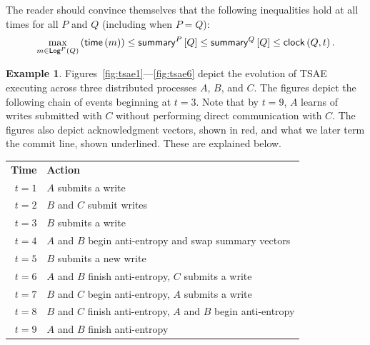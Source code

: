 \documentclass[]             %
{NASA}                       %
\theoremstyle{definition}
\newtheorem{example}[theorem]{Example}
\begin{document}
The reader should convince themselves that the following inequalities
hold at all times for all $P$ and $Q$ (including when $P = Q$):
\[
  \max_{m \in \mathsf{Log}^{P}\left(Q\right)}\left({\mathsf{time}\left(m\right)}\right) \leq \mathsf{summary}^{P}\left[Q\right] \leq \mathsf{summary}^{Q}\left[Q\right] \leq \mathsf{clock}\left(Q,t\right).
\]

\begin{example}
  \label{ex:tsae}
  Figures~\ref{fig:tsae1}---\ref{fig:tsae6} depict the evolution of
  TSAE executing across three distributed processes $A$, $B$, and
  $C$. The figures depict the following chain of events beginning at
  $t = 3$. Note that by $t = 9$, $A$ learns of writes submitted with
  $C$ without performing direct communication with $C$. The figures
  also depict acknowledgment vectors, shown in red, and what we later
  term the commit line, shown underlined. These are explained below.

  \begin{centering}
    \begin{tabular}{rl}\\
      \textbf{Time}    & \textbf{Action} \\
      $t = 1$   & $A$ submits a write                                            \\
      $t = 2$   & $B$ and $C$ submit writes                                      \\
      $t = 3$   & $B$ submits a write                                            \\
      $t = 4$ & $A$ and $B$ begin anti-entropy and swap summary vectors \\
      $t = 5$ & $B$ submits a new write  \\
      $t = 6$ & $A$ and $B$ finish anti-entropy, $C$ submits a write \\
      $t = 7$ & $B$ and $C$ begin anti-entropy, $A$ submits a write \\
      $t = 8$ & $B$ and $C$ finish anti-entropy, $A$ and $B$ begin anti-entropy \\
      $t = 9$ & $A$ and $B$ finish anti-entropy
    \end{tabular}
  \end{centering}
\end{example}
\end{document}
